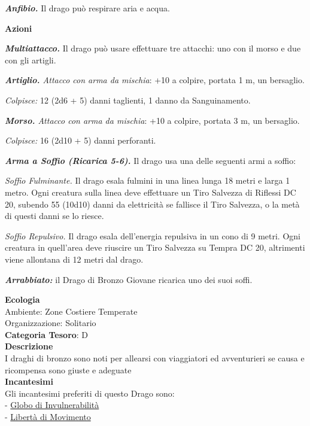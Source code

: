 \begin{multicols}{2}
{\emph{\textbf{Anfibio.}} Il drago può respirare aria e acqua.

\textbf{Azioni}

\emph{\textbf{Multiattacco.}} Il drago può usare effettuare tre attacchi: uno con il morso e due con gli artigli.

\emph{\textbf{Artiglio.} Attacco con arma da mischia}: +10 a colpire, portata 1 m, un bersaglio.

\emph{Colpisce:} 12 (2d6 + 5) danni taglienti, 1 danno da Sanguinamento.

\emph{\textbf{Morso.} Attacco con arma da mischia}: +10 a colpire, portata 3 m, un bersaglio.

\emph{Colpisce:} 16 (2d10 + 5) danni perforanti.

\emph{\textbf{Arma a Soffio (Ricarica 5-6).}} Il drago usa una delle seguenti armi a soffio:

\emph{Soffio Fulminante.} Il drago esala fulmini in una linea lunga 18 metri e larga 1 metro. Ogni creatura sulla linea deve effettuare un Tiro Salvezza di Riflessi DC 20, subendo 55 (10d10) danni da elettricità se fallisce il Tiro Salvezza, o la metà di questi danni se lo riesce.

\emph{Soffio Repulsivo.} Il drago esala dell'energia repulsiva in un cono di 9 metri. Ogni creatura in quell'area deve riuscire un Tiro Salvezza su Tempra DC 20, altrimenti viene allontana di 12 metri dal drago.

\emph{\textbf{Arrabbiato:}} il Drago di Bronzo Giovane ricarica uno dei suoi soffi.

\textbf{Ecologia}\\
Ambiente: Zone Costiere Temperate\\
Organizzazione: Solitario\\
\textbf{Categoria Tesoro}: D\\
\textbf{Descrizione}\\
I draghi di bronzo sono noti per allearsi con viaggiatori ed avventurieri se causa e ricompensa sono giuste e adeguate\\
\textbf{Incantesimi}\\
Gli incantesimi preferiti di questo Drago sono:\\
- \hyperlink{Globo di Invulnerabilità}{Globo di Invulnerabilità}\\
- \hyperlink{Libertà di Movimento}{Libertà di Movimento}

}
\end{multicols}
